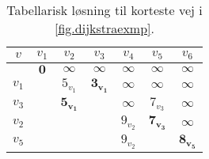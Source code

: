 \begin{table}[H]
\centering
\begin{tabular}{|c|c|c|c|c|c|c|}
\hline
$v$ & $v_1$ & $v_2$ & $v_3$ & $v_4$ & $v_5$ & $v_6$ \\ \hline
  & $\boldsymbol{0}$ &  $\infty$ & $\infty$  & $\infty$  &  $\infty$  &  $\infty$  \\  
 $v_1$ &  & $5_{v_1}$ & $\boldsymbol{3_{v_1}}$ & $\infty$ & $\infty$ & $\infty$ \\  
 $v_3$ &  & $\boldsymbol{5_{v_1}}$ &  & $\infty$ & $7_{v_3}$ & $\infty$ \\  
 $v_2$ &  &  &  & $9_{v_2}$ & $\boldsymbol{7_{v_3}}$ & $\infty$ \\
 $v_5$ &  &  &  & $9_{v_2}$ &  & $\boldsymbol{8_{v_5}}$   \\ \hline
\end{tabular}
\caption{Tabellarisk løsning til korteste vej i \autoref{fig.dijkstraexmp}.}
\label{tab:dijkstraexmp}
\end{table}